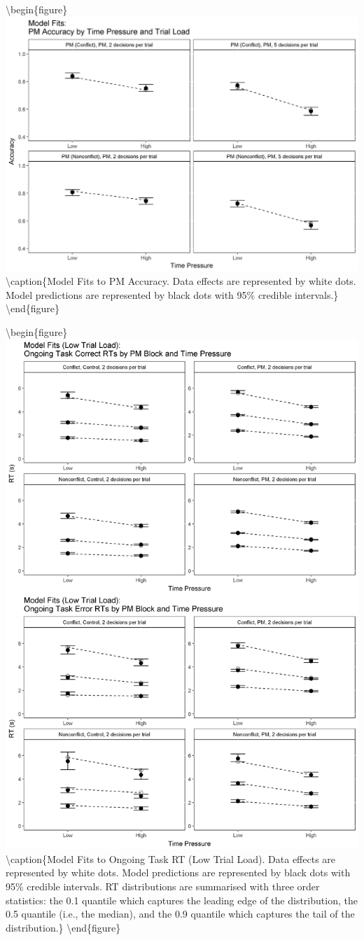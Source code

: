 \documentclass[11pt,]{article}
\begin{document}
\textbackslash{}begin\{figure\}
\includegraphics[width=0.8\linewidth]{figures/E1/E1.Fits.Accuracy.PM}
\textbackslash{}caption\{\label{fig:Fits.Accuracy.PM}Model Fits to PM
Accuracy. Data effects are represented by white dots. Model predictions
are represented by black dots with 95\% credible
intervals.\}\label{fig:Fit Plot: Accuracy PM}
\textbackslash{}end\{figure\}

\textbackslash{}begin\{figure\}
\includegraphics[width=0.8\linewidth]{figures/E1/E1.Fits.RT.Ongoing.2}
\textbackslash{}caption\{\label{fig:Fits.RT.Ongoing.2}Model Fits to
Ongoing Task RT (Low Trial Load). Data effects are represented by white
dots. Model predictions are represented by black dots with 95\% credible
intervals. RT distributions are summarised with three order statistics:
the 0.1 quantile which captures the leading edge of the distribution,
the 0.5 quantile (i.e., the median), and the 0.9 quantile which captures
the tail of the distribution.\}\label{fig:Fit Plot: RT Ongoing Low Load}
\textbackslash{}end\{figure\}
\end{document}
